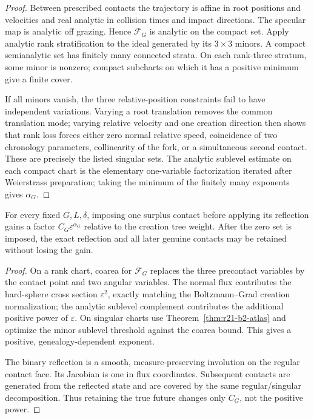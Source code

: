 \begin{proof}
Between prescribed contacts the trajectory is affine in root positions and
velocities and real analytic in collision times and impact directions.  The
specular map is analytic off grazing.  Hence $\mathcal F_G$ is analytic on the
compact set.  Apply analytic rank stratification to the ideal generated by
its $3\times3$ minors.  A compact semianalytic set has finitely many connected
strata.  On each rank-three stratum, some minor is nonzero; compact
subcharts on which it has a positive minimum give a finite cover.

If all minors vanish, the three relative-position constraints fail to have
independent variations.  Varying a root translation removes the common
translation mode; varying relative velocity and one creation direction then
shows that rank loss forces either zero normal relative speed, coincidence of
two chronology parameters, collinearity of the fork, or a simultaneous second
contact.  These are precisely the listed singular sets.  The analytic
sublevel estimate on each compact chart is the elementary one-variable
factorization iterated after Weierstrass preparation; taking the minimum of
the finitely many exponents gives $\alpha_G$.
\end{proof}

\begin{lemma}
\label{lem:r21-b2-gain}
For every fixed $G,L,\delta$, imposing one surplus contact before applying its
reflection gains a factor $C_G\varepsilon^{\alpha_G}$ relative to the creation
tree weight.  After the zero set is imposed, the exact reflection and all
later genuine contacts may be retained without losing the gain.
\end{lemma}

\begin{proof}
On a rank chart, coarea for $\mathcal F_G$ replaces the three precontact
variables by the contact point and two angular variables.  The normal flux
contributes the hard-sphere cross section $\varepsilon^2$, exactly matching
the Boltzmann--Grad creation normalization; the analytic sublevel complement
contributes the additional positive power of $\varepsilon$.  On singular
charts use Theorem~\ref{thm:r21-b2-atlas} and optimize the minor sublevel
threshold against the coarea bound.  This gives a positive, genealogy-dependent
exponent.

The binary reflection is a smooth, measure-preserving involution on the
regular contact face.  Its Jacobian is one in flux coordinates.  Subsequent
contacts are generated from the reflected state and are covered by the same
regular/singular decomposition.  Thus retaining the true future changes only
$C_G$, not the positive power.
\end{proof}

